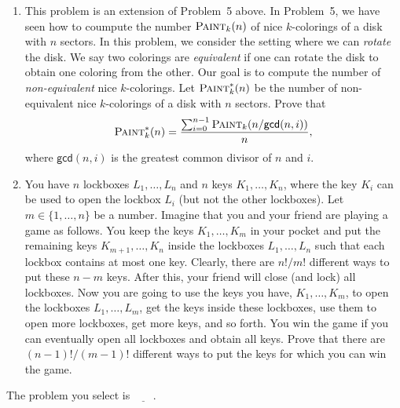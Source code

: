 \documentclass[11pt,twoside]{article}
\begin{document}
\begin{enumerate}
    \item This problem is an extension of Problem~5 above.
    In Problem~5, we have seen how to coumpute the number $\textsc{Paint}_k(n)$ of nice $k$-colorings of a disk with $n$ sectors.
    In this problem, we consider the setting where we can \textit{rotate} the disk.
    We say two colorings are \textit{equivalent} if one can rotate the disk to obtain one coloring from the other.
    Our goal is to compute the number of \textit{non-equivalent} nice $k$-colorings.
    Let $\textsc{Paint}_k^*(n)$ be the number of non-equivalent nice $k$-colorings of a disk with $n$ sectors.
    Prove that
    \begin{equation*}
        \textsc{Paint}_k^*(n) = \frac{\sum_{i=0}^{n-1} \textsc{Paint}_k(n/\mathsf{gcd}(n,i))}{n},
    \end{equation*}
    where $\mathsf{gcd}(n,i)$ is the greatest common divisor of $n$ and $i$.
    
    \item You have $n$ lockboxes $L_1,\dots,L_n$ and $n$ keys $K_1,\dots,K_n$, where the key $K_i$ can be used to open the lockbox $L_i$ (but not the other lockboxes).
    Let $m \in \{1,\dots,n\}$ be a number.
    Imagine that you and your friend are playing a game as follows.
    You keep the keys $K_1,\dots,K_m$ in your pocket and put the remaining keys $K_{m+1},\dots,K_n$ inside the lockboxes $L_1,\dots,L_n$ such that each lockbox contains at most one key.
    Clearly, there are $n!/m!$ different ways to put these $n-m$ keys.
    After this, your friend will close (and lock) all lockboxes.
    Now you are going to use the keys you have, $K_1,\dots,K_m$, to open the lockboxes $L_1,\dots,L_m$, get the keys inside these lockboxes, use them to open more lockboxes, get more keys, and so forth.
    You win the game if you can eventually open all lockboxes and obtain all keys.
    Prove that there are $(n-1)!/(m-1)!$ different ways to put the keys for which you can win the game.
\end{enumerate}

The problem you select is $\underline{\ \ \ \ \ \ \ \ }$.
\end{document}
